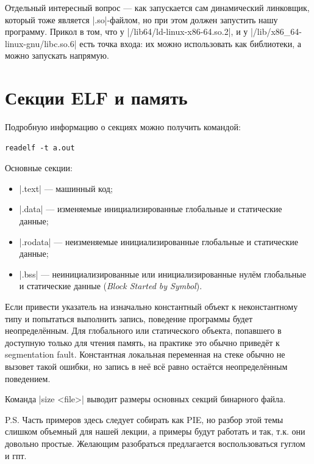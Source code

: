 \documentclass[11pt]{article}
\begin{document}
Отдельный интересный вопрос --- как запускается сам динамический линковщик, который тоже
является \nolint|.so|-файлом, но при этом должен запустить нашу программу. Прикол в том, что у
\nolint|/lib64/ld-linux-x86-64.so.2|, и у \nolint|/lib/x86_64-linux-gnu/libc.so.6| есть точка входа: их можно использовать как
библиотеки, а можно запускать напрямую.

\section{Секции ELF и память}

Подробную информацию о секциях можно получить командой:

\begin{lstlisting}
readelf -t a.out
\end{lstlisting}

Основные секции:

\begin{itemize}
    \item \nolint|.text| --- машинный код;
    \item \nolint|.data| --- изменяемые инициализированные глобальные и статические данные;
    \item \nolint|.rodata| --- неизменяемые инициализированные глобальные и статические данные;
    \item \nolint|.bss| --- неинициализированные или инициализированные нулём глобальные и статические
    данные (\textit{Block Started by Symbol}).
\end{itemize}

Если привести указатель на изначально константный объект к неконстантному типу и
попытаться выполнить запись, поведение программы будет неопределённым. Для глобального или
статического объекта, попавшего в доступную только для чтения память, на практике это обычно приведёт
к segmentation fault. Константная локальная переменная на стеке обычно не вызовет такой ошибки, но
запись в неё всё равно остаётся неопределённым поведением.

Команда \nolint|size <file>| выводит размеры основных секций бинарного файла.

P.S. Часть примеров здесь следует собирать как PIE, но разбор этой темы слишком объемный для нашей лекции, а примеры будут работать и так, т.к. они довольно простые. Желающим разобраться предлагается воспользоваться гуглом и гпт.
\end{document}
